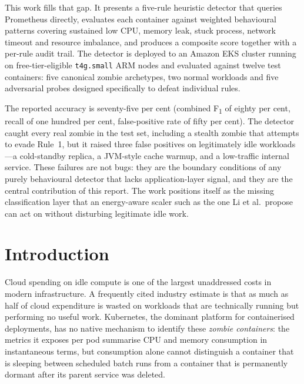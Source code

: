 \documentclass[11pt,a4paper,oneside]{article}
\begin{document}
This work fills that gap. It presents a five-rule heuristic detector that
queries Prometheus directly, evaluates each container against weighted
behavioural patterns covering sustained low CPU, memory leak, stuck process,
network timeout and resource imbalance, and produces a composite score
together with a per-rule audit trail. The detector is deployed to an
Amazon EKS cluster running on free-tier-eligible \texttt{t4g.small} ARM nodes
and evaluated against twelve test containers: five canonical zombie
archetypes, two normal workloads and five adversarial probes designed
specifically to defeat individual rules.

The reported accuracy is seventy-five per cent (combined F\textsubscript{1}
of eighty per cent, recall of one hundred per cent, false-positive rate of
fifty per cent). The detector caught every real zombie in the test set,
including a stealth zombie that attempts to evade Rule~1, but it raised
three false positives on legitimately idle workloads---a cold-standby
replica, a JVM-style cache warmup, and a low-traffic internal service.
These failures are not bugs: they are the boundary conditions of any
purely behavioural detector that lacks application-layer signal, and they
are the central contribution of this report. The work positions itself as
the missing classification layer that an energy-aware scaler such as the
one Li et al.\ propose can act on without disturbing legitimate idle work.

\newpage
\tableofcontents
\listoffigures
\listoftables

\newpage

\section{Introduction}
\label{sec:intro}

Cloud spending on idle compute is one of the largest unaddressed costs in
modern infrastructure. A frequently cited industry estimate is that as much
as half of cloud expenditure is wasted on workloads that are technically
running but performing no useful work. Kubernetes, the dominant platform
for containerised deployments, has no native mechanism to identify these
\emph{zombie containers}: the metrics it exposes per pod summarise CPU and
memory consumption in instantaneous terms, but consumption alone cannot
distinguish a container that is sleeping between scheduled batch runs from
a container that is permanently dormant after its parent service was
deleted.
\end{document}
